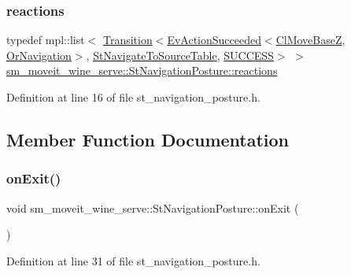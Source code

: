 \subsubsection{\texorpdfstring{reactions}{reactions}}
{\footnotesize\ttfamily typedef mpl\+::list$<$ \hyperlink{classsmacc_1_1Transition}{Transition}$<$\hyperlink{structsmacc_1_1default__events_1_1EvActionSucceeded}{Ev\+Action\+Succeeded}$<$\hyperlink{classcl__move__base__z_1_1ClMoveBaseZ}{Cl\+Move\+BaseZ}, \hyperlink{classsm__moveit__wine__serve_1_1OrNavigation}{Or\+Navigation}$>$, \hyperlink{structsm__moveit__wine__serve_1_1StNavigateToSourceTable}{St\+Navigate\+To\+Source\+Table}, \hyperlink{structsmacc_1_1default__transition__tags_1_1SUCCESS}{S\+U\+C\+C\+E\+SS}$>$ $>$ \hyperlink{structsm__moveit__wine__serve_1_1StNavigationPosture_a33af22227eae66be5110f376d8f536a5}{sm\+\_\+moveit\+\_\+wine\+\_\+serve\+::\+St\+Navigation\+Posture\+::reactions}}



Definition at line 16 of file st\+\_\+navigation\+\_\+posture.\+h.



\subsection{Member Function Documentation}
\mbox{\label{structsm__moveit__wine__serve_1_1StNavigationPosture_a78436f77e573ba406b0deeb7bfb1f7ac}} 
\subsubsection{\texorpdfstring{on\+Exit()}{onExit()}}
{\footnotesize\ttfamily void sm\+\_\+moveit\+\_\+wine\+\_\+serve\+::\+St\+Navigation\+Posture\+::on\+Exit (\begin{DoxyParamCaption}{ }\end{DoxyParamCaption})\hspace{0.3cm}{\ttfamily [inline]}}



Definition at line 31 of file st\+\_\+navigation\+\_\+posture.\+h.



